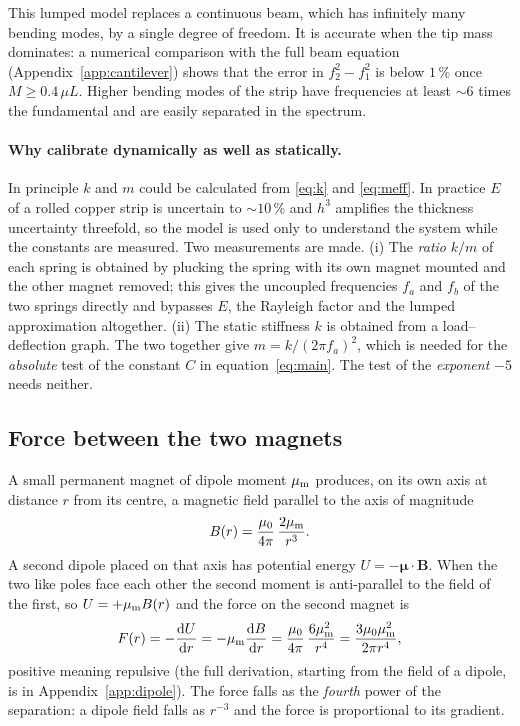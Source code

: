 This lumped model replaces a continuous beam, which has infinitely many bending modes, by a single degree of freedom. It is accurate when the tip mass dominates: a numerical comparison with the full beam equation (Appendix~\ref{app:cantilever}) shows that the error in $f_2^2-f_1^2$ is below $1\,\%$ once $M\geq0.4\,\mu L$. Higher bending modes of the strip have frequencies at least $\sim 6$ times the fundamental and are easily separated in the spectrum.

\paragraph{Why calibrate dynamically as well as statically.} In principle $k$ and $m$ could be calculated from \eqref{eq:k} and \eqref{eq:meff}. In practice $E$ of a rolled copper strip is uncertain to $\sim10\,\%$ and $h^3$ amplifies the thickness uncertainty threefold, so the model is used only to understand the system while the constants are measured. Two measurements are made. (i) The \emph{ratio} $k/m$ of each spring is obtained by plucking the spring with its own magnet mounted and the other magnet removed; this gives the uncoupled frequencies $f_a$ and $f_b$ of the two springs directly and bypasses $E$, the Rayleigh factor and the lumped approximation altogether. (ii) The static stiffness $k$ is obtained from a load--deflection graph. The two together give $m=k/(2\pi f_a)^2$, which is needed for the \emph{absolute} test of the constant $C$ in equation~\eqref{eq:main}. The test of the \emph{exponent} $-5$ needs neither.

\subsection{Force between the two magnets}\label{sec:force}

A small permanent magnet of dipole moment $\mu_{\mathrm m}$ produces, on its own axis at distance $r$ from its centre, a magnetic field parallel to the axis of magnitude \cite{griffiths}
\begin{equation}
B(r)=\frac{\mu_0}{4\pi}\,\frac{2\mu_{\mathrm m}}{r^3}.
\label{eq:Baxis}
\end{equation}
A second dipole placed on that axis has potential energy $U=-\bm\mu\cdot\bm B$. When the two like poles face each other the second moment is anti-parallel to the field of the first, so $U=+\mu_{\mathrm m} B(r)$ and the force on the second magnet is
\begin{equation}
F(r)=-\frac{\mathrm{d} U}{\mathrm{d} r}=-\mu_{\mathrm m}\frac{\mathrm{d} B}{\mathrm{d} r}=\frac{\mu_0}{4\pi}\,\frac{6\mu_{\mathrm m}^2}{r^4}
      =\frac{3\mu_0\mu_{\mathrm m}^2}{2\pi r^4},
\label{eq:F}
\end{equation}
positive meaning repulsive (the full derivation, starting from the field of a dipole, is in Appendix~\ref{app:dipole}). The force falls as the \emph{fourth} power of the separation: a dipole field falls as $r^{-3}$ and the force is proportional to its gradient.

